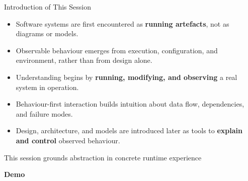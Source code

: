 \documentclass[aspectratio=169, table]{beamer}
\begin{document}
\begin{frame}{Introduction of This Session}
	\vspace{10pt}
	\begin{itemize}
		\item Software systems are first encountered as \textbf{running artefacts}, not as diagrams or models.
		\item Observable behaviour emerges from execution, configuration, and environment, rather than from design alone.
		\item Understanding begins by \textbf{running, modifying, and observing} a real system in operation.
		\item Behaviour-first interaction builds intuition about data flow, dependencies, and failure modes.
		\item Design, architecture, and models are introduced later as tools to \textbf{explain and control} observed behaviour.
	\end{itemize}
	
	\vspace{6pt}
	{\footnotesize This session grounds abstraction in concrete runtime experience}
\end{frame}

	\begin{frame}{\hfill}
		\centering
		\Huge{\textbf{Demo}}
	\end{frame}
\end{document}
